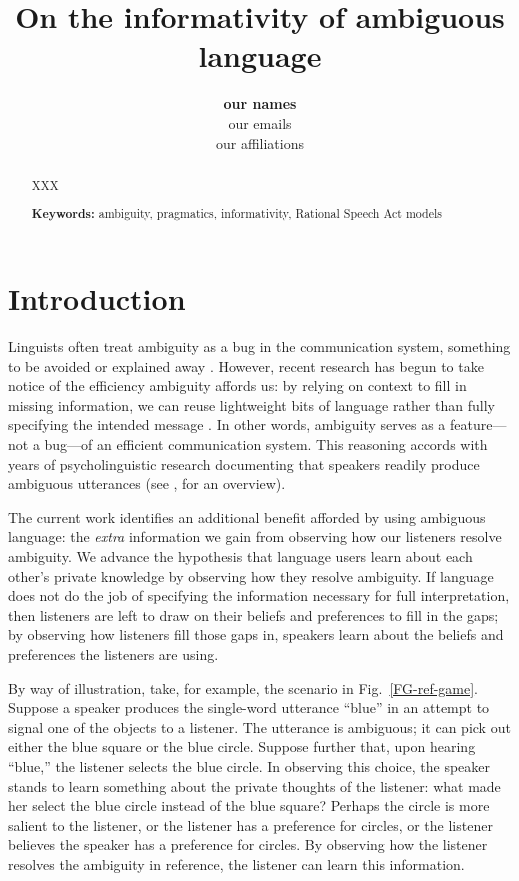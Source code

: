 \documentclass[10pt,a4paper]{article}
\title{On the informativity of ambiguous language}
\author{\large \textbf{our names}\\
our emails\\
our affiliations}
\begin{document}
\maketitle

\begin{abstract}
XXX


\textbf{Keywords:} 
ambiguity, pragmatics, informativity, Rational Speech Act models

\end{abstract}

\section{Introduction}

Linguists often treat ambiguity as a bug in the communication system, something to be avoided or explained away \cite{grice1975,chomsky2002minimalism}. However, recent research has begun to take notice of the efficiency ambiguity affords us: by relying on context to fill in missing information, we can reuse lightweight bits of language rather than fully specifying the intended message \cite{levinson2000,piantadosietal2012,wasow2015}. In other words, ambiguity serves as a feature---not a bug---of an efficient communication system. This reasoning accords with years of psycholinguistic research documenting that speakers readily produce ambiguous utterances (see , for an overview). 

The current work identifies an additional benefit afforded by using ambiguous language: the \emph{extra} information we gain from observing how our listeners resolve ambiguity. We advance the hypothesis that language users learn about each other's private knowledge by observing how they resolve ambiguity. If language does not do the job of specifying the information necessary for full interpretation, then listeners are left to draw on their beliefs and preferences to fill in the gaps; by observing how listeners fill those gaps in, speakers learn about the beliefs and preferences the listeners are using. 

By way of illustration, take, for example, the scenario in Fig.~\ref{FG-ref-game}. Suppose a speaker produces the single-word utterance ``blue'' in an attempt to signal one of the objects to a listener. The utterance is ambiguous; it can pick out either the blue square or the blue circle. Suppose further that, upon hearing ``blue,'' the listener selects the blue circle. In observing this choice, the speaker stands to learn something about the private thoughts of the listener: what made her select the blue circle instead of the blue square? Perhaps the circle is more salient to the listener, or the listener has a preference for circles, or the listener believes the speaker has a preference for circles. By observing how the listener resolves the ambiguity in reference, the listener can learn this information. 
\end{document}
